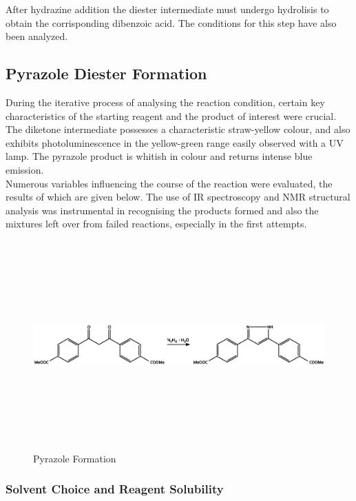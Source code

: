 \documentclass[../Master.tex]{subfiles}
\begin{document}
After hydrazine addition the diester intermediate must undergo hydrolisis to obtain the corrisponding dibenzoic acid. The conditions for this step have also been analyzed.

\subsection{Pyrazole Diester Formation}\label{sec:pyrazole-diester}

During the iterative process of analysing the reaction condition, certain key characteristics of the starting reagent and the product of interest were crucial. The diketone intermediate possesses a characteristic straw-yellow colour, and also exhibits photoluminescence in the yellow-green range easily observed with a UV lamp. The pyrazole product is whitish in colour and returns intense blue emission.\\
Numerous variables influencing the course of the reaction were evaluated, the results of which are given below. The use of IR spectroscopy and NMR structural analysis was instrumental in recognising the products formed and also the mixtures left over from failed reactions, especially in the first attempts.

\begin{figure}[h!]
	\centering
	\includegraphics[width=13cm,height=8cm,keepaspectratio]{Structures/pyrazole-form.eps}
	\caption{Pyrazole Formation}\label{fig:pyrazole-form}
\end{figure}

\subsubsection{Solvent Choice and Reagent Solubility}\label{sec:solvent}
\end{document}
